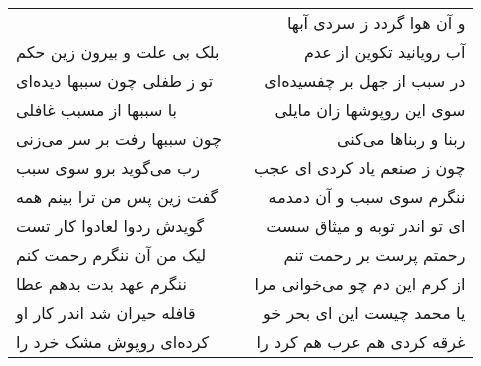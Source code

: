 \begin{center}
\begin{longtable}{l p{0.5cm} r}
&&
و آن هوا گردد ز سردی آبها
\\
بلک بی علت و بیرون زین حکم
&&
آب رویانید تکوین از عدم
\\
تو ز طفلی چون سببها دیده‌ای
&&
در سبب از جهل بر چفسیده‌ای
\\
با سببها از مسبب غافلی
&&
سوی این روپوشها زان مایلی
\\
چون سببها رفت بر سر می‌زنی
&&
ربنا و ربناها می‌کنی
\\
رب می‌گوید برو سوی سبب
&&
چون ز صنعم یاد کردی ای عجب
\\
گفت زین پس من ترا بینم همه
&&
ننگرم سوی سبب و آن دمدمه
\\
گویدش ردوا لعادوا کار تست
&&
ای تو اندر توبه و میثاق سست
\\
لیک من آن ننگرم رحمت کنم
&&
رحمتم پرست بر رحمت تنم
\\
ننگرم عهد بدت بدهم عطا
&&
از کرم این دم چو می‌خوانی مرا
\\
قافله حیران شد اندر کار او
&&
یا محمد چیست این ای بحر خو
\\
کرده‌ای روپوش مشک خرد را
&&
غرقه کردی هم عرب هم کرد را
\\
\end{longtable}
\end{center}
